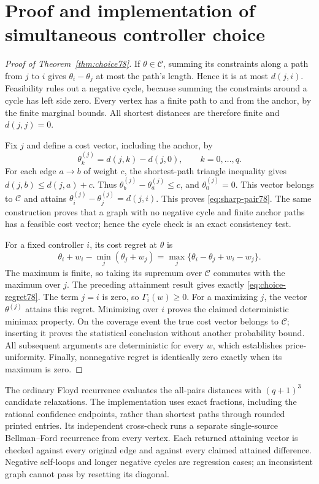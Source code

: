 \section{Proof and implementation of simultaneous controller choice}\label{app:choice78}
\begin{proof}[Proof of Theorem~\ref{thm:choice78}]
If $\theta\in\mathcal C$, summing its constraints along a path from $j$ to $i$ gives $\theta_i-\theta_j$ at most the path's length. Hence it is at most $d(j,i)$. Feasibility rules out a negative cycle, because summing the constraints around a cycle has left side zero. Every vertex has a finite path to and from the anchor, by the finite marginal bounds. All shortest distances are therefore finite and $d(j,j)=0$.

Fix $j$ and define a cost vector, including the anchor, by
\[
 \theta_k^{(j)}=d(j,k)-d(j,0),\qquad k=0,\ldots,q.
\]
For each edge $a\to b$ of weight $c$, the shortest-path triangle inequality gives $d(j,b)\le d(j,a)+c$. Thus $\theta_b^{(j)}-\theta_a^{(j)}\le c$, and $\theta_0^{(j)}=0$. This vector belongs to $\mathcal C$ and attains $\theta_i^{(j)}-\theta_j^{(j)}=d(j,i)$. This proves \eqref{eq:sharp-pair78}. The same construction proves that a graph with no negative cycle and finite anchor paths has a feasible cost vector; hence the cycle check is an exact consistency test.

For a fixed controller $i$, its cost regret at $\theta$ is
\[
 \theta_i+w_i-\min_j(\theta_j+w_j)
 =\max_j\{\theta_i-\theta_j+w_i-w_j\}.
\]
The maximum is finite, so taking its supremum over $\mathcal C$ commutes with the maximum over $j$. The preceding attainment result gives exactly \eqref{eq:choice-regret78}. The term $j=i$ is zero, so $\Gamma_i(w)\ge0$. For a maximizing $j$, the vector $\theta^{(j)}$ attains this regret. Minimizing over $i$ proves the claimed deterministic minimax property. On the coverage event the true cost vector belongs to $\mathcal C$; inserting it proves the statistical conclusion without another probability bound. All subsequent arguments are deterministic for every $w$, which establishes price-uniformity. Finally, nonnegative regret is identically zero exactly when its maximum is zero.
\end{proof}

The ordinary Floyd recurrence evaluates the all-pairs distances with $(q+1)^3$ candidate relaxations. The implementation uses exact fractions, including the rational confidence endpoints, rather than shortest paths through rounded printed entries. Its independent cross-check runs a separate single-source Bellman--Ford recurrence from every vertex. Each returned attaining vector is checked against every original edge and against every claimed attained difference. Negative self-loops and longer negative cycles are regression cases; an inconsistent graph cannot pass by resetting its diagonal.

